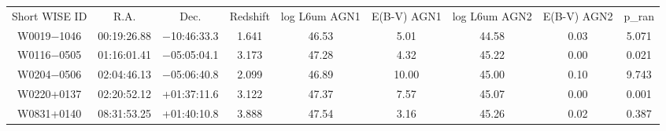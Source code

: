 \begin{table}
\begin{tabular}{ccccccccc}
Short WISE ID & R.A. & Dec. & Redshift & log L6um AGN1 & E(B-V) AGN1 & log L6um AGN2 & E(B-V) AGN2 & p_ran \\
W0019$-$1046 & 00:19:26.88 & $-$10:46:33.3 & 1.641 & 46.53 & 5.01 & 44.58 & 0.03 & 5.071 \\
W0116$-$0505 & 01:16:01.41 & $-$05:05:04.1 & 3.173 & 47.28 & 4.32 & 45.22 & 0.00 & 0.021 \\
W0204$-$0506 & 02:04:46.13 & $-$05:06:40.8 & 2.099 & 46.89 & 10.00 & 45.00 & 0.10 & 9.743 \\
W0220+0137 & 02:20:52.12 & +01:37:11.6 & 3.122 & 47.37 & 7.57 & 45.07 & 0.00 & 0.001 \\
W0831+0140 & 08:31:53.25 & +01:40:10.8 & 3.888 & 47.54 & 3.16 & 45.26 & 0.02 & 0.387 \\
\end{tabular}
\end{table}
